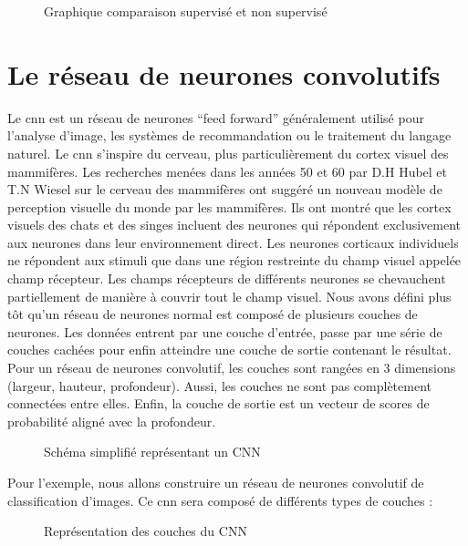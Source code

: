\documentclass[debug,nodate,hideweeklyreports,noposter]{polytech/polytech}
\begin{document}
\begin{figure}
  \caption{Graphique comparaison supervisé et non supervisé}
  \label{fig:superunsuper}
\end{figure}

\section{Le réseau de neurones convolutifs}

Le \gls{cnn} est un réseau de neurones “feed forward” généralement utilisé pour l’analyse d’image, les systèmes de recommandation ou le traitement du langage naturel.
Le \gls{cnn} s’inspire du cerveau, plus particulièrement du cortex visuel des mammifères. Les recherches menées dans les années 50 et 60 par D.H Hubel et T.N Wiesel sur le cerveau des mammifères ont suggéré un nouveau modèle de perception visuelle du monde par les mammifères. Ils ont montré que les cortex visuels des chats et des singes incluent des neurones qui répondent exclusivement aux neurones dans leur environnement direct. Les neurones corticaux individuels ne répondent aux stimuli que dans une région restreinte du champ visuel appelée champ récepteur. Les champs récepteurs de différents neurones se chevauchent partiellement de manière à couvrir tout le champ visuel.
Nous avons défini plus tôt qu’un réseau de neurones normal est composé de plusieurs couches de neurones. Les données entrent par une couche d’entrée, passe par une série de couches cachées pour enfin atteindre une couche de sortie contenant le résultat. Pour un réseau de neurones convolutif, les couches sont rangées en 3 dimensions (largeur, hauteur, profondeur). Aussi, les couches ne sont pas complètement connectées entre elles. Enfin, la couche de sortie est un vecteur de scores de probabilité aligné avec la profondeur.

\begin{figure}
  \caption{Schéma simplifié représentant un CNN}
  \label{fig:cnnsimple}
\end{figure}

Pour l’exemple, nous allons construire un réseau de neurones convolutif de classification d’images.
Ce \gls{cnn} sera composé de différents types de couches :

\begin{figure}
  \caption{Représentation des couches du CNN}
  \label{fig:cnnlayers}
\end{figure}
\end{document}
